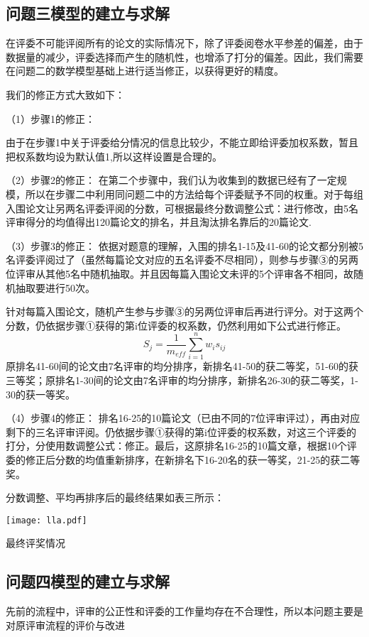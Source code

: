 \documentclass{my_paper}
\begin{document}
	\subsection{问题三模型的建立与求解}
	
	在评委不可能评阅所有的论文的实际情况下，除了评委阅卷水平参差的偏差，由于数据量的减少，评委选择而产生的随机性，也增添了打分的偏差。因此，我们需要在问题二的数学模型基础上进行适当修正，以获得更好的精度。
	
	我们的修正方式大致如下：
	
	（1）步骤1的修正：
	
	由于在步骤1中关于评委给分情况的信息比较少，不能立即给评委加权系数，暂且把权系数均设为默认值1,所以这样设置是合理的。
	
	
	（2）步骤2的修正：
	在第二个步骤中，我们认为收集到的数据已经有了一定规模，所以在步骤二中利用同问题二中的方法给每个评委赋予不同的权重。对于每组入围论文让另两名评委评阅的分数，可根据最终分数调整公式：进行修改，由5名评审得分的均值得出120篇论文的排名，并且淘汰排名靠后的20篇论文.
	
	（3）步骤3的修正：
	依据对题意的理解，入围的排名1-15及41-60的论文都分别被5名评委评阅过了（虽然每篇论文对应的五名评委不尽相同），则参与步骤③的另两位评审从其他5名中随机抽取。并且因每篇入围论文未评的5个评审各不相同，故随机抽取要进行50次。
	
	针对每篇入围论文，随机产生参与步骤③的另两位评审后再进行评分。对于这两个分数，仍依据步骤①获得的第i位评委的权系数，仍然利用如下公式进行修正。
	$$S_j= \displaystyle \frac{1}{m_{eff}}\sum_{i=1}^{n}w_i s_{ij}$$
	原排名41-60间的论文由7名评审的均分排序，新排名41-50的获二等奖，51-60的获三等奖；原排名1-30间的论文由7名评审的均分排序，新排名26-30的获二等奖，1-30的获一等奖。
	
	（4）步骤4的修正：
	排名16-25的10篇论文（已由不同的7位评审评过），再由对应剩下的三名评审评阅。仍依据步骤①获得的第i位评委的权系数，对这三个评委的打分，分使用数调整公式：修正。最后，这原排名16-25的10篇文章，根据10个评委的修正后分数的均值重新排序，在新排名下16-20名的获一等奖，21-25的获二等奖。
	
	分数调整、平均再排序后的最终结果如表三所示：
	\begin{table}
		\centering
		\texttt{[image: lla.pdf]}
		\caption{最终评奖情况}
	\end{table}
	
	\newpage
	\subsection{问题四模型的建立与求解}
	先前的流程中，评审的公正性和评委的工作量均存在不合理性，所以本问题主要是对原评审流程的评价与改进
	
\end{document}
